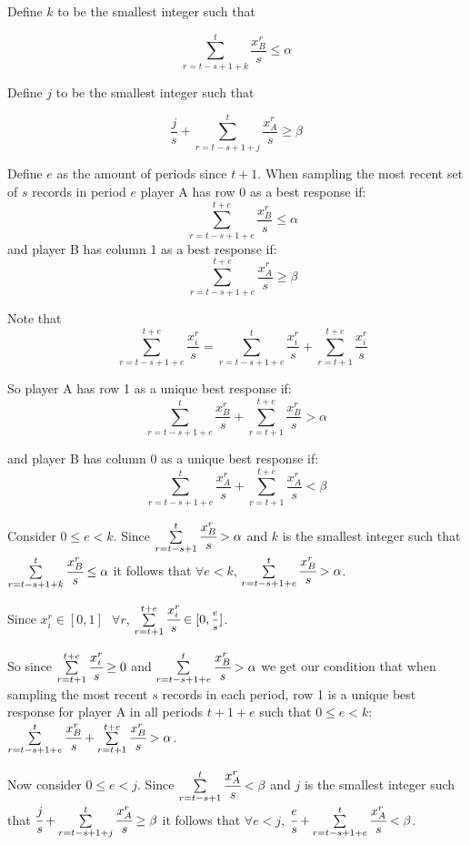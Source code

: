 \documentclass{article}
\begin{document}
\vskip12pt

Define $k$ to be the smallest integer such that

$$\sum\limits_{r=t-s+1+k}^{t} \frac{x^r_B}{s} \leq \alpha$$

Define $j$ to be the smallest integer such that

$$\frac{j}{s}+\sum\limits_{r=t-s+1+j}^{t} \frac{x^r_A}{s} \geq \beta$$

\vskip12pt

Define $e$ as the amount of periods since $t+1$. When sampling the most recent set of $s$ records in period $e$ player A has row 0 as a best response if: 
$$\hspace{12pt} \sum\limits_{r=t-s+1+e}^{t+e} \frac{x^r_B}{s} \leq \alpha$$
and player B has column 1 as a best response if:
$$\hspace{12pt} \sum\limits_{r=t-s+1+e}^{t+e} \frac{x^r_A}{s} \geq \beta$$

Note that
$$\hspace{12pt} \sum\limits_{r=t-s+1+e}^{t+e} \frac{x^r_i}{s} = \sum\limits_{r=t-s+1+e}^{t}\frac{x^r_i}{s}+\sum\limits_{r=t+1}^{t+e} \frac{x^r_i}{s}$$

So player A has row 1 as a unique best response if: 
$$\sum\limits_{r=t-s+1+e}^{t}\frac{x^r_B}{s}+\sum\limits_{r=t+1}^{t+e} \frac{x^r_B}{s} > \alpha$$

and player B has column 0 as a unique best response if:
$$\sum\limits_{r=t-s+1+e}^{t}\frac{x^r_A}{s}+\sum\limits_{r=t+1}^{t+e} \frac{x^r_A}{s} < \beta$$

Consider $0 \leq e<k$. Since $\sum\limits_{r=t-s+1}^{t} \cfrac{x^r_B}{s} > \alpha$ and $k$ is the smallest integer such that $\sum\limits_{r=t-s+1+k}^{t} \cfrac{x^r_B}{s} \leq \alpha$ it follows that $\forall e<k$, $\sum\limits_{r=t-s+1+e}^{t} \cfrac{x^r_B}{s} > \alpha$.

Since $x_i^r \in [0,1] \hspace{8pt} \forall r$, $\sum\limits_{r=t+1}^{t+e} \cfrac{x^r_i}{s} \in [0,\mfrac{e}{s}]$.

So since $\sum\limits_{r=t+1}^{t+e} \cfrac{x^r_i}{s} \geq 0$ and $\sum\limits_{r=t-s+1+e}^{t} \cfrac{x^r_B}{s} > \alpha$ we get our condition that when sampling the most recent $s$ records in each period, row 1 is a unique best response for player A in all periods $t+1+e$ such that $0 \leq e<k$: $\sum\limits_{r=t-s+1+e}^{t}\cfrac{x^r_B}{s}+\sum\limits_{r=t+1}^{t+e} \cfrac{x^r_B}{s} > \alpha$.

\vskip12pt

Now consider $0 \leq e<j$. Since $\sum\limits_{r=t-s+1}^{t} \cfrac{x^r_A}{s} < \beta$ and $j$ is the smallest integer such that $\cfrac{j}{s}+\sum\limits_{r=t-s+1+j}^{t} \cfrac{x^r_A}{s} \geq \beta$ it follows that $\forall e<j$, $\cfrac{e}{s}+\sum\limits_{r=t-s+1+e}^{t} \cfrac{x^r_A}{s} < \beta$.
\end{document}
